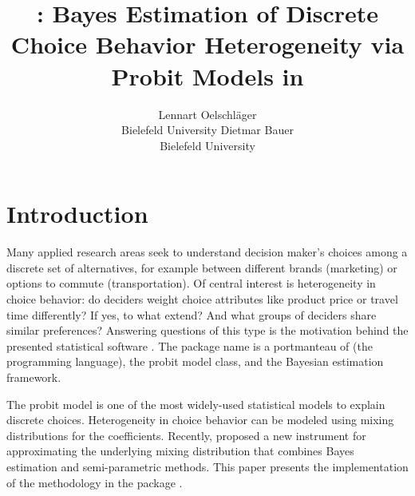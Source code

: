 \documentclass[article]{jss}
\author{Lennart Oelschl\"ager \\Bielefeld University \And Dietmar Bauer\\Bielefeld University}
\title{\pkg{RprobitB}: Bayes Estimation of Discrete Choice Behavior Heterogeneity via Probit Models in \proglang{R}}
\newcommand{\fct}[1]{\code{#1()}}
\begin{document}



\section{Introduction}
\label{sec:introduction}

Many applied research areas seek to understand decision maker's choices among a discrete set of alternatives, for example between different brands (marketing) or options to commute (transportation). Of central interest is heterogeneity in choice behavior: do deciders weight choice attributes like product price or travel time differently? If yes, to what extend? And what groups of deciders share similar preferences? Answering questions of this type is the motivation behind the presented statistical software  \citep{Oelschlaeger:2021}. The package name is a portmanteau of  (the programming language), the probit model class, and the Bayesian estimation framework.

The probit model is one of the most widely-used statistical models to explain discrete choices.  Heterogeneity in choice behavior can be modeled using mixing distributions for the coefficients. Recently, \cite{Oelschlaeger:2020} proposed a new instrument for approximating the underlying mixing distribution that combines Bayes estimation and semi-parametric methods. This paper presents the implementation of the methodology in the  package .
\end{document}
